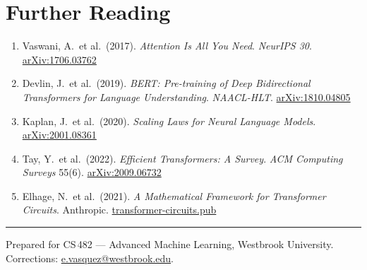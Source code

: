 \section{Further Reading}

\begin{enumerate}[label=\textcolor{accent}{\arabic*.}]
  \item Vaswani, A.\ et al.\ (2017). \textit{Attention Is All You Need}.
        \textit{NeurIPS 30}.
        \href{https://arxiv.org/abs/1706.03762}{arXiv:1706.03762}

  \item Devlin, J.\ et al.\ (2019). \textit{BERT: Pre-training of Deep Bidirectional
        Transformers for Language Understanding}. \textit{NAACL-HLT}.
        \href{https://arxiv.org/abs/1810.04805}{arXiv:1810.04805}

  \item Kaplan, J.\ et al.\ (2020). \textit{Scaling Laws for Neural Language Models}.
        \href{https://arxiv.org/abs/2001.08361}{arXiv:2001.08361}

  \item Tay, Y.\ et al.\ (2022). \textit{Efficient Transformers: A Survey}.
        \textit{ACM Computing Surveys} 55(6).
        \href{https://arxiv.org/abs/2009.06732}{arXiv:2009.06732}

  \item Elhage, N.\ et al.\ (2021). \textit{A Mathematical Framework for
        Transformer Circuits}. Anthropic.
        \href{https://transformer-circuits.pub/2021/framework/index.html}{transformer-circuits.pub}
\end{enumerate}

\vspace{6pt}
{\color{rulecol}\rule{\linewidth}{0.4pt}}
{\footnotesize\color{neutral!70}%
  \faInfoCircle\enspace
  Prepared for CS\,482 — Advanced Machine Learning,
  Westbrook University. Corrections: \href{mailto:e.vasquez@westbrook.edu}{e.vasquez@westbrook.edu}.%
}
